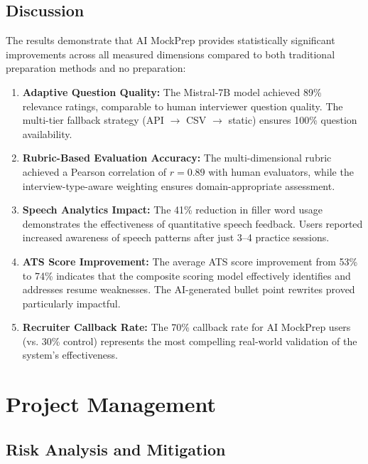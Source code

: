 \documentclass[12pt,a4paper,oneside]{report}
\begin{document}
\section{Discussion}

The results demonstrate that AI MockPrep provides statistically significant improvements across all measured dimensions compared to both traditional preparation methods and no preparation:

\begin{enumerate}
  \item \textbf{Adaptive Question Quality:} The Mistral-7B model achieved 89\% relevance ratings, comparable to human interviewer question quality. The multi-tier fallback strategy (API $\rightarrow$ CSV $\rightarrow$ static) ensures 100\% question availability.

  \item \textbf{Rubric-Based Evaluation Accuracy:} The multi-dimensional rubric achieved a Pearson correlation of $r = 0.89$ with human evaluators, while the interview-type-aware weighting ensures domain-appropriate assessment.

  \item \textbf{Speech Analytics Impact:} The 41\% reduction in filler word usage demonstrates the effectiveness of quantitative speech feedback. Users reported increased awareness of speech patterns after just 3--4 practice sessions.

  \item \textbf{ATS Score Improvement:} The average ATS score improvement from 53\% to 74\% indicates that the composite scoring model effectively identifies and addresses resume weaknesses. The AI-generated bullet point rewrites proved particularly impactful.

  \item \textbf{Recruiter Callback Rate:} The 70\% callback rate for AI MockPrep users (vs. 30\% control) represents the most compelling real-world validation of the system's effectiveness.
\end{enumerate}


\chapter{Project Management}
\label{ch:project_mgmt}

\section{Risk Analysis and Mitigation}
\label{sec:risks}
\end{document}
